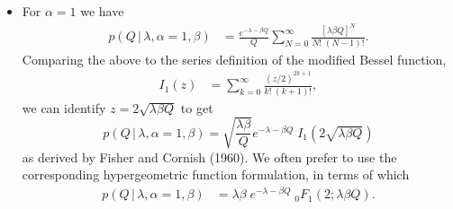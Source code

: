 \documentclass[11pt]{article}
\newcommand{\cond}{\,|\,}
\begin{document}
\begin{itemize}
\item For $\alpha=1$ we have
  \begin{align}
    p(Q\cond \lambda,\alpha{=}1,\beta) 
    &= \frac{e^{-\lambda - \beta Q}}{Q}
      \sum_{N=0}^\infty 
      \frac{[\lambda \beta Q]^N}{N!\;(N-1)!}.
  \end{align}
  Comparing the above to the series definition of the modified Bessel function,
  \begin{align}
    I_1(z) &= \sum_{k=0}^\infty \frac{(z/2)^{2k+1}}{k!\;(k+1)!},
  \end{align}
  we can identify $z = 2\sqrt{\lambda\beta Q}$ to get
  \begin{equation}
    \boxed{
      p(Q\cond \lambda,\alpha{=}1,\beta) 
      = \sqrt{\frac{\lambda\beta}{Q}}  e^{-\lambda - \beta Q} 
      \;I_1\!\left(2\sqrt{\lambda\beta Q}\right)
      }
  \end{equation}
  as derived by Fisher and Cornish (1960). We often prefer to use the 
  corresponding hypergeometric function formulation, in terms of which
  \begin{align}
    p(Q\cond \lambda,\alpha{=}1,\beta) 
    &= \lambda\beta\; e^{-\lambda - \beta Q} 
      \;{}_0F_1(2; \lambda\beta Q).
  \end{align}


\end{itemize}
\end{document}
